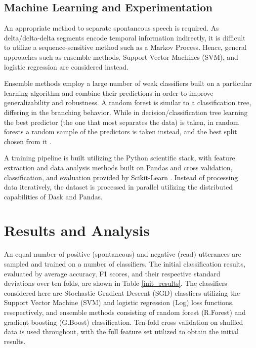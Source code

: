 \documentclass[conference]{IEEEtran}
\begin{document}
\subsection{Machine Learning and Experimentation}

An appropriate method to separate spontaneous speech is required.
As delta/delta-delta segments encode temporal information indirectly, it is difficult to utilize a sequence-sensitive method such as a Markov Process.
Hence, general approaches such as ensemble methods, Support Vector Machines (SVM), and logistic regression are considered instead.

Ensemble methods employ a large number of weak classifiers built on a particular learning algorithm and combine their predictions in order to improve generalizability and robustness.
A random forest is similar to a classification tree, differing in the branching behavior.
While in decision/classification tree learning the best predictor (the one that most separates the data) is taken, in random forests a random sample of the predictors is taken instead, and the best split chosen from it \cite{liaw}.

A training pipeline is built utilizing the Python scientific stack, with feature extraction and data analysis methods built on Pandas and cross validation, classification, and evaluation provided by Scikit-Learn \cite{sklearn}.
Instead of processing data iteratively, the dataset is processed in parallel utilizing the distributed capabilities of Dask and Pandas.

\section{Results and Analysis}

An equal number of positive (spontaneous) and negative (read) utterances are sampled and trained on a number of classifiers.
The initial classification results, evaluated by average accuracy, F1 scores, and their respective standard deviations over ten folds, are shown in Table \ref{init_results}.
The classifiers considered here are Stochastic Gradient Descent (SGD) classfiers utilizing the Support Vector Machine (SVM) and logistic regression (Log) loss functions, resepectively, and ensemble methods consisting of random forest (R.Forest) and gradient boosting (G.Boost) classification.
Ten-fold cross validation on shuffled data is used throughout, with the full feature set utilized to obtain the initial results.
\end{document}
